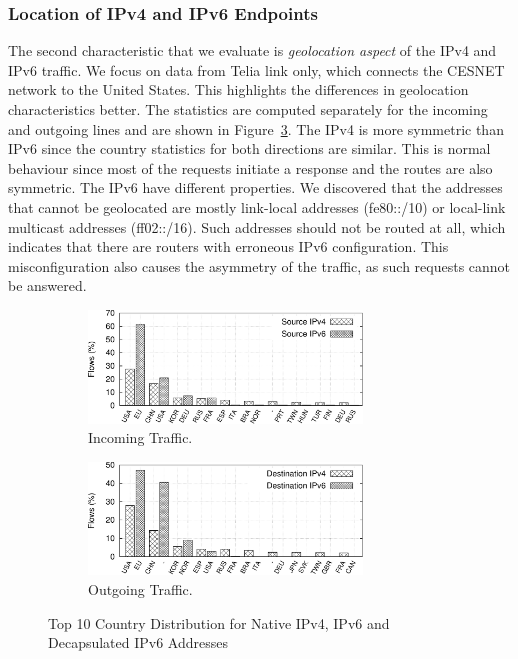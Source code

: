 \subsubsection{Location of IPv4 and IPv6 Endpoints}
The second characteristic that we evaluate is \textit{geolocation aspect} of the IPv4 and IPv6 traffic. We focus on data from Telia link only, which connects the CESNET network to the United States. This highlights the differences in geolocation characteristics better. The statistics are computed separately for the incoming and outgoing lines and are shown in Figure~\ref{fig:ipv6-tunnels-top-ten-geo}. The IPv4 is more symmetric than IPv6 since the country statistics for both directions are similar. This is normal behaviour since most of the requests initiate a response and the routes are also symmetric. The IPv6 have different properties. We discovered that the addresses that cannot be geolocated are mostly link-local addresses (fe80::/10) or local-link multicast addresses (ff02::/16). Such addresses should not be routed at all, which indicates that there are routers with erroneous IPv6 configuration. This misconfiguration also causes the asymmetry of the traffic, as such requests cannot be answered.

\begin{figure}[!tb]
     \begin{subfigure}{\textwidth}
        \centering
        \includegraphics[width=0.8\textwidth]{figures/paper-tunnels/ctry_distribution/ctry_distribution-native-in}
        \caption{Incoming Traffic.}
        \label{fig:ipv6-tunnels-geo-native-in}
    \end{subfigure}
    \hfill
    \begin{subfigure}{\textwidth}
        \centering
        \includegraphics[width=0.8\textwidth]{figures/paper-tunnels/ctry_distribution/ctry_distribution-native-out}
        \caption{Outgoing Traffic.}
        \label{fig:ipv6-tunnels-geo-native-out}
    \end{subfigure}
    \caption{Top 10 Country Distribution for Native IPv4, IPv6 and Decapsulated IPv6 Addresses}
    \label{fig:ipv6-tunnels-top-ten-geo}
\end{figure}

